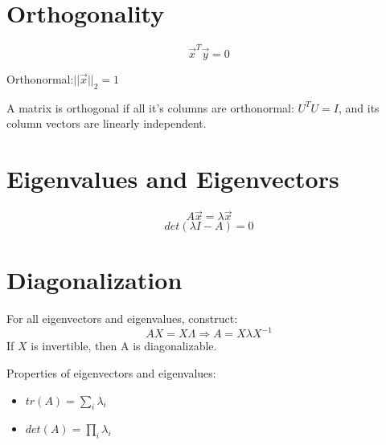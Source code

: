 \documentclass[letterpaper,10pt]{article}
\begin{document}
\section{Orthogonality}

$$\vec{x}^T\vec{y}=0$$

Orthonormal:$||\vec{x}||_2=1$

A matrix is orthogonal if all it's columns are orthonormal: $U^TU=I$, and its column vectors are linearly independent.

\section{Eigenvalues and Eigenvectors}

$$A\vec{x}=\lambda\vec{x}$$
$$det(\lambda I - A)=0$$

\section{Diagonalization}

For all eigenvectors and eigenvalues, construct:
$$AX=X\Lambda \Rightarrow A=X\lambda X^{-1}$$
If $X$ is invertible, then A is diagonalizable.

Properties of eigenvectors and eigenvalues:
\begin{itemize}
	\item $tr(A)=\sum_i{\lambda_i}$
	\item $det(A)=\prod_i{\lambda_i}$
	
\end{itemize}
\end{document}
